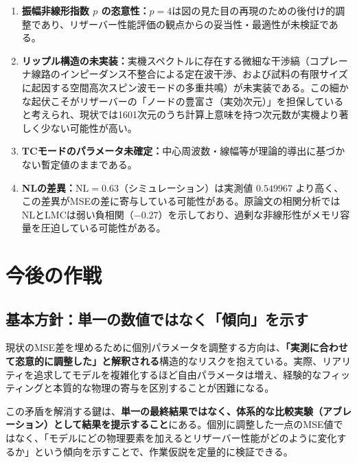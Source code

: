 \documentclass[11pt,a4paper]{ltjsarticle}
\begin{document}
\begin{enumerate}[leftmargin=8mm]
\item \textbf{振幅非線形指数 $p$ の恣意性：}$p=4$は図の見た目の再現のための後付け的調整であり、リザーバー性能評価の観点からの妥当性・最適性が未検証である。

\item \textbf{リップル構造の未実装：}実機スペクトルに存在する微細な干渉縞（コプレーナ線路のインピーダンス不整合による定在波干渉、および試料の有限サイズに起因する空間高次スピン波モードの多重共鳴）が未実装である。この細かな起伏こそがリザーバーの「ノードの豊富さ（実効次元）」を担保していると考えられ、現状では1601次元のうち計算上意味を持つ次元数が実機より著しく少ない可能性が高い。

\item \textbf{TCモードのパラメータ未確定：}中心周波数・線幅等が理論的導出に基づかない暫定値のままである。

\item \textbf{NLの差異：}$\mathrm{NL}=0.63$（シミュレーション）は実測値 $0.549967$ より高く、この差異がMSEの差に寄与している可能性がある。原論文の相関分析ではNLとLMCは弱い負相関（$-0.27$）を示しており、過剰な非線形性がメモリ容量を圧迫している可能性がある。
\end{enumerate}

\section{今後の作戦}\label{sec:strategy}

\subsection{基本方針：単一の数値ではなく「傾向」を示す}

現状のMSE差を埋めるために個別パラメータを調整する方向は、\textbf{「実測に合わせて恣意的に調整した」と解釈される}構造的なリスクを抱えている。実際、リアリティを追求してモデルを複雑化するほど自由パラメータは増え、経験的なフィッティングと本質的な物理の寄与を区別することが困難になる。

この矛盾を解消する鍵は、\textbf{単一の最終結果ではなく、体系的な比較実験（アブレーション）として結果を提示すること}にある。個別に調整した一点のMSE値ではなく、「モデルにどの物理要素を加えるとリザーバー性能がどのように変化するか」という傾向を示すことで、作業仮説を定量的に検証できる。
\end{document}
